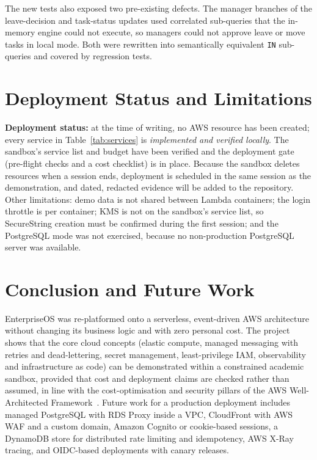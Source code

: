 \documentclass[conference]{IEEEtran}
\newcommand{\code}[1]{\texttt{\small #1}}
\begin{document}
The new tests also exposed two pre-existing defects. The manager branches of the
leave-decision and task-status updates used correlated sub-queries that the in-memory engine
could not execute, so managers could not approve leave or move tasks in local mode. Both were
rewritten into semantically equivalent \code{IN} sub-queries and covered by regression tests.

\section{Deployment Status and Limitations}
\textbf{Deployment status:} at the time of writing, no AWS resource has been created; every
service in Table~\ref{tab:services} is \emph{implemented and verified locally}. The sandbox's
service list and budget have been verified and the deployment gate (pre-flight checks and a
cost checklist) is in place. Because the sandbox deletes resources when a session ends,
deployment is scheduled in the same session as the demonstration, and dated, redacted evidence
will be added to the repository. Other limitations: demo data is not shared between Lambda
containers; the login throttle is per container; KMS is not on the sandbox's service list,
so SecureString creation must be confirmed during the first session; and the PostgreSQL mode
was not exercised, because no non-production PostgreSQL server was available.

\section{Conclusion and Future Work}
EnterpriseOS was re-platformed onto a serverless, event-driven AWS architecture without
changing its business logic and with zero personal cost. The project shows that the core
cloud concepts (elastic compute, managed messaging with retries and dead-lettering, secret
management, least-privilege IAM, observability and infrastructure as code) can be
demonstrated within a constrained academic sandbox, provided that cost and deployment claims
are checked rather than assumed, in line with the cost-optimisation and security pillars of the AWS Well-Architected Framework~\cite{aws-wellarch}. Future work for a production deployment includes managed
PostgreSQL with RDS Proxy inside a VPC, CloudFront with AWS WAF and a custom domain, Amazon
Cognito or cookie-based sessions, a DynamoDB store for distributed rate limiting and
idempotency, AWS X-Ray tracing, and OIDC-based deployments with canary releases.
\end{document}
